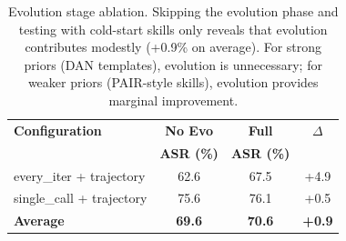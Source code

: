 \begin{table}[t]
\centering
\caption{Evolution stage ablation. Skipping the evolution phase and testing with cold-start skills only reveals that evolution contributes modestly (+0.9\% on average). For strong priors (DAN templates), evolution is unnecessary; for weaker priors (PAIR-style skills), evolution provides marginal improvement.}
\label{tab:evolution_ablation}
\small
\begin{tabular}{lccc}
\toprule
\textbf{Configuration} & \textbf{No Evo} & \textbf{Full} & \textbf{$\Delta$} \\
 & \textbf{ASR (\%)} & \textbf{ASR (\%)} & \\
\midrule
every\_iter + trajectory & 62.6 & 67.5 & +4.9 \\
single\_call + trajectory & 75.6 & 76.1 & +0.5 \\
\textbf{Average} & \textbf{69.6} & \textbf{70.6} & \textbf{+0.9} \\
\bottomrule
\end{tabular}
\end{table}
